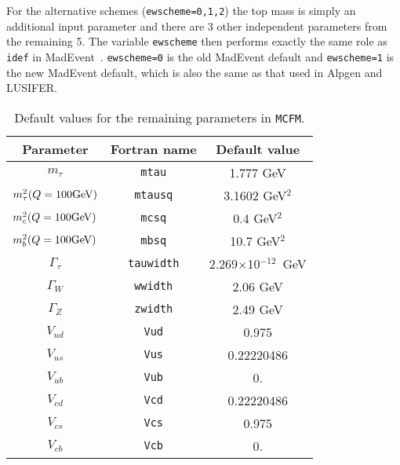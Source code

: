 \documentclass[12pt]{article}
\begin{document}
For the alternative schemes ({\tt ewscheme=0,1,2}) the top mass is simply
an additional input parameter and there are 3 other independent
parameters from the remaining 5. The variable {\tt ewscheme} then performs
exactly the same role as {\tt idef} in MadEvent~\cite{Maltoni:2002qb}.
{\tt ewscheme=0} is the old MadEvent default and {\tt ewscheme=1} is the
new MadEvent default, which is also the same as that used in Alpgen and
LUSIFER. 

\begin{table}
\begin{center}
\begin{tabular}{|c|c|c|} \hline
Parameter & Fortran name & Default value \\ 
\hline
$m_\tau$         & {\tt mtau}      & 1.777 GeV            \\
$m^2_\tau(Q=100\mbox{GeV})$& {\tt mtausq}  & 3.1602 GeV$^2$     \\
$m^2_c(Q=100\mbox{GeV})$   & {\tt mcsq}    & 0.4  GeV$^2$       \\
$m^2_b(Q=100\mbox{GeV})$   & {\tt mbsq}    & 10.7 GeV$^2$       \\
$\Gamma_\tau$    & {\tt tauwidth}& 2.269$\times$10$^{-12}$~GeV \\
$\Gamma_W$       & {\tt wwidth}  & 2.06 GeV               \\
$\Gamma_Z$       & {\tt zwidth}  & 2.49 GeV               \\
$V_{ud}$         & {\tt Vud}     & 0.975                  \\
$V_{us}$         & {\tt Vus}     & 0.22220486             \\
$V_{ub}$         & {\tt Vub}     & 0.                     \\
$V_{cd}$         & {\tt Vcd}     & 0.22220486             \\
$V_{cs}$         & {\tt Vcs}     & 0.975                  \\
$V_{cb}$         & {\tt Vcb}     & 0.                     \\
\hline
\end{tabular}
\caption{Default values for the remaining parameters in {\tt MCFM}.}
\label{default} 
\end{center}
\end{table}
\end{document}
